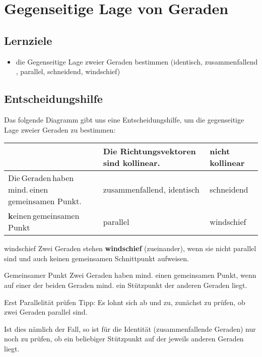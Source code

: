 \section{Gegenseitige Lage von Geraden}

\subsection*{Lernziele}
\begin{itemize}
  \item die Gegenseitige Lage zweier Geraden bestimmen (identisch,
    zusammenfallend
    ,
    parallel,
    schneidend, windschief)
\end{itemize}

\subsection{Entscheidungshilfe}
Das folgende Diagramm gibt uns eine Entscheidungshilfe, um die
gegenseitige Lage zweier Geraden zu bestimmen:

\vspace{3mm}

\begin{tabular}{p{60mm}|p{50mm}|p{50mm}}
  & Die Richtungsvektoren sind kollinear. &  \textbf{nicht} kollinear\\\hline
Die\,Geraden\,haben mind.\,einen\,gemeinsamen Punkt.  & zusammenfallend, identisch& schneidend\\\hline
\textbf{k}einen\,gemeinsamen Punkt & parallel & windschief
\end{tabular}

\begin{definition}{windschief}{}
  Zwei Geraden stehen \textbf{windschief} (zueinander), wenn sie nicht
  parallel sind und auch keinen gemeinsamen Schnittpunkt aufweisen.
\end{definition}

\begin{bemerkung}{Gemeinsamer Punkt}{}
  Zwei Geraden haben mind. einen gemeinsamen Punkt, wenn auf einer der
  beiden Geraden mind. ein Stützpunkt der anderen Geraden liegt.  
\end{bemerkung}

\begin{bemerkung}{Erst Parallelität prüfen}{}
Tipp: Es lohnt sich ab und zu, zunächst zu prüfen, ob zwei Geraden parallel
sind.

Ist dies nämlich der Fall, so ist für die Identität (zusammenfallende
Geraden) nur noch zu prüfen, ob ein beliebiger Stützpunkt auf der
jeweils anderen Geraden liegt.
\end{bemerkung}


